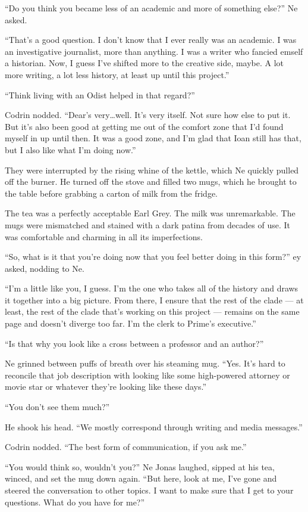 ``Do you think you became less of an academic and more of something else?'' Ne asked.

``That's a good question. I don't know that I ever really was an academic. I was an investigative journalist, more than anything. I was a writer who fancied emself a historian. Now, I guess I've shifted more to the creative side, maybe. A lot more writing, a lot less history, at least up until this project.''

``Think living with an Odist helped in that regard?''

Codrin nodded. ``Dear's very\ldots well. It's very itself. Not sure how else to put it. But it's also been good at getting me out of the comfort zone that I'd found myself in up until then. It was a good zone, and I'm glad that Ioan still has that, but I also like what I'm doing now.''

They were interrupted by the rising whine of the kettle, which Ne quickly pulled off the burner. He turned off the stove and filled two mugs, which he brought to the table before grabbing a carton of milk from the fridge.

The tea was a perfectly acceptable Earl Grey. The milk was unremarkable. The mugs were mismatched and stained with a dark patina from decades of use. It was comfortable and charming in all its imperfections.

``So, what is it that you're doing now that you feel better doing in this form?'' ey asked, nodding to Ne.

``I'm a little like you, I guess. I'm the one who takes all of the history and draws it together into a big picture. From there, I ensure that the rest of the clade — at least, the rest of the clade that's working on this project — remains on the same page and doesn't diverge too far. I'm the clerk to Prime's executive.''

``Is that why you look like a cross between a professor and an author?''

Ne grinned between puffs of breath over his steaming mug. ``Yes. It's hard to reconcile that job description with looking like some high-powered attorney or movie star or whatever they're looking like these days.''

``You don't see them much?''

He shook his head. ``We mostly correspond through writing and media messages.''

Codrin nodded. ``The best form of communication, if you ask me.''

``You would think so, wouldn't you?'' Ne Jonas laughed, sipped at his tea, winced, and set the mug down again. ``But here, look at me, I've gone and steered the conversation to other topics. I want to make sure that I get to your questions. What do you have for me?''

